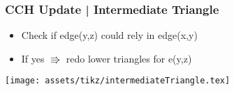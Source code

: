 \begin{frame}
    \frametitle{CCH Update | Intermediate Triangle}
    \begin{itemize}
        \item Check if edge(y,z) could rely in edge(x,y)
        \item If yes $\Rrightarrow$ redo lower triangles for e(y,z)
    \end{itemize}

    \texttt{[image: assets/tikz/intermediateTriangle.tex]}
\end{frame}